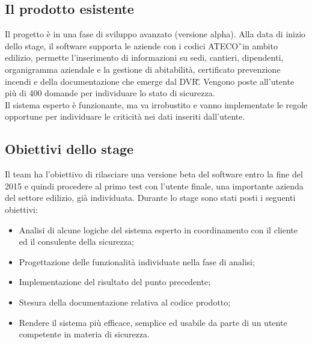\subsection{Il prodotto esistente}

Il progetto è in una fase di sviluppo avanzato (versione alpha).
Alla data di inizio dello stage, il software supporta le aziende con i codici \gls{ATECO}\G\ in ambito edilizio, permette l’inserimento di informazioni su sedi, cantieri, dipendenti, organigramma aziendale e la gestione di abitabilità, certificato prevenzione incendi e della documentazione che emerge dal \gls{DVR}\G.
Vengono poste all'utente più di 400 domande per individuare lo stato di sicurezza. \\ 
Il sistema esperto è funzionante, ma va irrobustito e vanno implementate le regole opportune per individuare le criticità nei dati inseriti dall'utente.


\subsection{Obiettivi dello stage}

Il team ha l’obiettivo di rilasciare una versione beta del software entro la fine del 2015 e quindi procedere al primo test con l’utente finale, una importante azienda del settore edilizio, già  individuata.
Durante lo stage sono stati posti i seguenti obiettivi:
\begin{itemize}
\item Analisi di alcune logiche del sistema esperto in coordinamento con il cliente ed il consulente della sicurezza;
\item Progettazione delle funzionalità individuate nella fase di analisi;
\item Implementazione del risultato del punto precedente;
\item Stesura della documentazione relativa al codice prodotto;
\item Rendere il sistema più efficace, semplice ed usabile da parte di un utente competente in materia di sicurezza.
\end{itemize}
